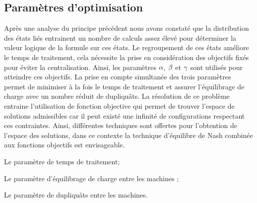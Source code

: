 
\subsection{Paramètres d’optimisation}
 
Après une analyse du principe précèdent nous avons constaté que la distribution des états liés entrainent un nombre de calculs assez élevé pour déterminer la valeur logique de la formule sur ces états. Le regroupement de ces états améliore le temps de traitement, cela nécessite la prise en considération des objectifs fixés pour éviter la centralisation. Ainsi, les paramètres $\parametreone{}$, $\parametretwo{}$ et $\parametretree{}$ sont utilisés pour atteindre ces objectifs. La prise en compte simultanée des trois paramètres permet de minimiser à la fois le temps de traitement et assurer l’équilibrage de charge avec un nombre réduit de dupliquâts. La résolution de ce problème entraine l'utilisation de fonction objective qui permet de trouver l'espace de solutions admissibles car il peut existé une infinité de configurations respectant ces contraintes. Ainsi, différentes techniques sont offertes pour l'obtention de l'espace des solutions, dans ce contexte la technique d’équilibre de Nash combinée aux fonctions objectifs est envisageable.
\begin{description}[leftmargin=*,labelindent=1em]
	\item[$\parametreone{}$] Le paramètre de temps de traitement;
	\item [$\parametretwo{}$] Le paramètre d'équilibrage de charge entre les machines ;
	\item [$\parametretree{}$] Le paramètre de dupliquâts  entre les machines.
\end{description}


